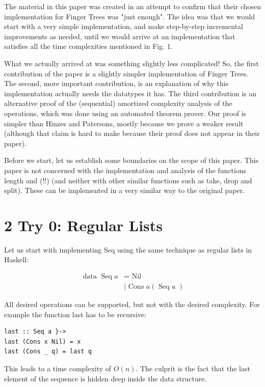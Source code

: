 \documentclass[10pt]{article}
\begin{document}
The material in this paper was created in an attempt to confirm that their chosen implementation for Finger Trees was "just enough". The idea was that we would start with a very simple implementation, and make step-by-step incremental improvements as needed, until we would arrive at an implementation that satisfies all the time complexities mentioned in Fig. 1.

What we actually arrived at was something slightly less complicated! So, the first contribution of the paper is a slightly simpler implementation of Finger Trees. The second, more important contribution, is an explanation of why this implementation actually needs the datatypes it has. The third contribution is an alternative proof of the (sequential) amortized complexity analysis of the operations, which was done using an automated theorem prover. Our proof is simpler than Hinzes and Patersons, mostly because we prove a weaker result (although that claim is hard to make because their proof does not appear in their paper).

Before we start, let us establish some boundaries on the scope of this paper. This paper is not concerned with the implementation and analysis of the functions length and (!!) (and neither with other similar functions such as take, drop and split). These can be implemented in a very similar way to the original paper.

\section*{2 Try 0: Regular Lists}
Let us start with implementing Seq using the same technique as regular lists in Haskell:

$$
\begin{aligned}
\operatorname{data} \text { Seq } a & =\text { Nil } \\
& \mid \text { Cons } a(\text { Seq a })
\end{aligned}
$$

All desired operations can be supported, but not with the desired complexity. For example the function last has to be recursive:

\begin{verbatim}
last :: Seq a }->
last (Cons x Nil) = x
last (Cons _ q) = last q
\end{verbatim}

This leads to a time complexity of $O(n)$. The culprit is the fact that the last element of the sequence is hidden deep inside the data structure.
\end{document}
